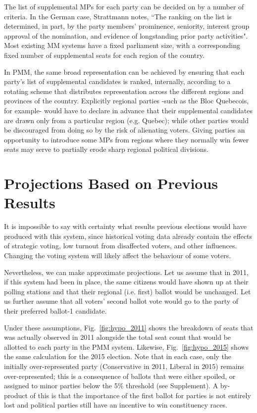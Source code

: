 \documentclass[DIV=calc, paper=a4, fontsize=11pt, twocolumn]{scrartcl}	 %
\begin{document}
The list of supplemental MPs for each party can be decided on by a number of criteria. 
In the German case, Strattmann notes\cite{Stratmann}, ``The ranking on the list is determined, in part, by the party members' prominence, seniority, interest group approval of the nomination, and evidence of longstanding prior party activities". 
Most existing MM systems have a fixed parliament size, with a corresponding fixed number of supplemental seats for each region of the country. 

In PMM, the same broad representation can be achieved by ensuring that each party's list of supplemental candidates is ranked, internally, according to a rotating scheme that distributes representation across the different regions and provinces of the country. 
Explicitly regional parties \--such as the Bloc Quebecois, for example\-- would have to declare in advance that their supplemental candidates are drawn only from a particular region (e.g. Quebec); while other parties would be discouraged from doing so by the risk of alienating voters. 
Giving parties an opportunity to introduce some MPs from regions where they normally win fewer seats may serve to partially erode sharp regional political divisions.

\section{Projections Based on Previous Results}
\label{sec:projections}

It is impossible to say with certainty what results previous elections would have produced with this system, since historical voting data already contain the effects of strategic voting, low turnout from disaffected voters, and other influences. Changing the voting system will likely affect the behaviour of some voters.

Nevertheless, we can make approximate projections. Let us assume that in 2011, if this system had been in place, the same citizens would have shown up at their polling stations and that their regional (i.e. first) ballot would be unchanged. 
Let us further assume that all voters' second ballot vote would go to the party of their preferred ballot-1 candidate. 

Under these assumptions, Fig.~\ref{fig:hypo_2011} shows the breakdown of seats that was actually observed in 2011 alongside the total seat count that would be allotted to each party in the PMM system. Likewise, Fig.~\ref{fig:hypo_2015} shows the same calculation for the 2015 election. Note that in each case, only the initially over-represented party (Conservative in 2011, Liberal in 2015) remains over-represented; this is a consequence of ballots that were either spoiled, or assigned to minor parties below the 5\% threshold (see Supplement). A by-product of this is that the importance of the first ballot for parties is not entirely lost and political parties still have an incentive to win constituency races.
\end{document}
